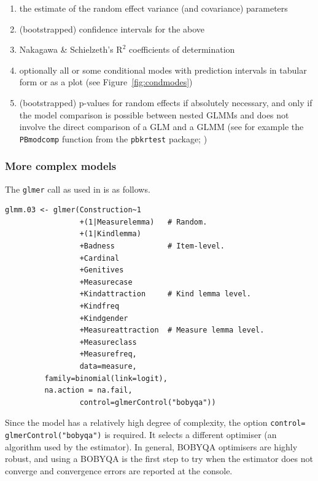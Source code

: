 \begin{enumerate}
  \item the estimate of the random effect variance (and covariance) parameters
  \item (bootstrapped) confidence intervals for the above
  \item Nakagawa \& Schielzeth's $\textrm{R}^{\textrm{2}}$ coefficients of determination
  \item optionally all or some conditional modes with prediction intervals in tabular form or as a plot (see Figure~\ref{fig:condmodes})
  \item (bootstrapped) p-values for random effects if absolutely necessary, and only if the model comparison is possible between nested GLMMs and does not involve the direct comparison of a GLM and a GLMM (see for example the \texttt{PBmodcomp} function from the \texttt{pbkrtest} package; \citealt{HalekohHojsgaard2014}) 
\end{enumerate}

\subsubsection{More complex models}
\label{sec:morecomplexmodelspractical}

The \texttt{glmer} call as used in \citet{Schaefer2018} is as follows.

\vspace{0.5\baselineskip}

\begin{lstlisting}
glmm.03 <- glmer(Construction~1
                 +(1|Measurelemma)   # Random.
                 +(1|Kindlemma)
                 +Badness            # Item-level.
                 +Cardinal
                 +Genitives
                 +Measurecase
                 +Kindattraction     # Kind lemma level.
                 +Kindfreq
                 +Kindgender
                 +Measureattraction  # Measure lemma level.
                 +Measureclass
                 +Measurefreq,
                 data=measure,
		 family=binomial(link=logit),
		 na.action = na.fail,
                 control=glmerControl("bobyqa"))
\end{lstlisting}

Since the model has a relatively high degree of complexity, the option \texttt{control=} \texttt{glmerControl("bobyqa")} is required.
It selects a different optimiser (an algorithm used by the estimator).
In general, BOBYQA optimisers are highly robust, and using a BOBYQA is the first step to try when the estimator does not converge and convergence errors are reported at the console.

